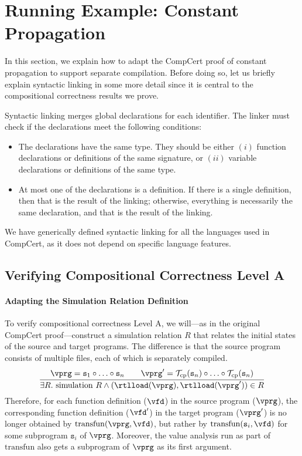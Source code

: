 \section{Running Example: Constant Propagation}
\label{sec:sepcomp:constprop}

In this section, we explain how to adapt the CompCert proof of
constant propagation to support separate compilation.  Before doing
so, let us briefly explain syntactic linking in some more detail since
it is central to the compositional correctness results we prove.

Syntactic linking merges global declarations for each identifier.
The linker must check if the declarations meet the following conditions:
\begin{itemize}
\item The declarations have the same type.  They should be either
  $(i)$ function declarations or definitions of the same signature, or
  $(ii)$ variable declarations or definitions of the same type.
\item At most one of the declarations is a definition.  If there is a
  single definition, then that is the result of the linking;
  otherwise, everything is necessarily the same declaration, and that
  is the result of the linking.
\end{itemize}
\noindent We have generically defined syntactic linking for all the
languages used in CompCert, as it does not depend on specific language
features.


\subsection{Verifying Compositional Correctness Level A}

\paragraph{Adapting the Simulation Relation Definition}

To verify compositional correctness Level A, we will---as in the
original CompCert proof---construct a simulation relation $R$ that
relates the initial states of the source and target programs.  The
difference is that the source program consists of multiple files, each
of which is separately compiled.
\[
\frac{
\begin{array}{@{}c@{}}
\vprg = \mathtt{s}_1\circ \ldots \circ \mathtt{s}_n \qquad
\vprg' = \mathcal{T}_\mathrm{cp}(\mathtt{s}_n)\circ \ldots \circ \mathcal{T}_\mathrm{cp}(\mathtt{s}_n)
\end{array}
}
{\exists R.~ \mathrm{simulation}~R \land (\rtlload(\vprg),\rtlload(\vprg'))\in R
}
\]
Therefore, for each function definition ($\vfd$) in the source program
($\vprg$), the corresponding function definition ($\vfd'$) in the
target program ($\vprg'$) is no longer obtained by
$\mathrm{transfun}(\vprg,\vfd)$, but rather by
$\mathrm{transfun}(\mathtt{s}_i,\vfd)$ for some subprogram
$\mathtt{s}_i$ of $\vprg$.  Moreover, the value analysis run as part
of $\mathrm{transfun}$ also gets a subprogram of $\vprg$ as its first
argument.


